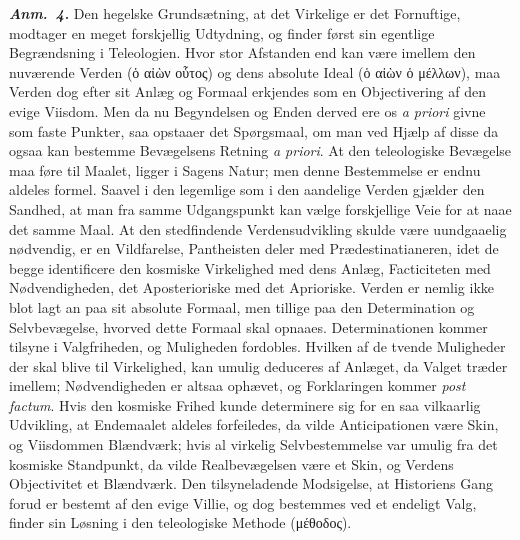 \documentclass[12pt]{book}
\newcommand{\anm}[1]{\emph{\textbf{Anm.~#1.}}}
\newcommand{\opage}[1]{\marginnote{\footnotesize\textit{[#1]}}}
\begin{document}
\anm{4} Den hegelske Grundsætning, at det Virkelige er det
Fornuftige, modtager en meget forskjellig Udtydning, og finder først
sin egentlige Begrændsning i Teleologien. Hvor stor Afstanden end
kan være imellem den nuværende Verden (ὁ αἰὼν οὗτος) og dens
absolute Ideal (ὁ αἰὼν ὁ μέλλων), maa Verden dog efter sit Anlæg og
Formaal erkjendes som en Objectivering af den evige Viisdom. Men da
nu Begyndelsen og Enden derved ere os \textit{a priori} givne som
faste Punkter, saa opstaaer det Spørgsmaal, om man ved Hjælp af
disse da ogsaa kan bestemme Bevægelsens Retning \textit{a priori}.
At den teleologiske Bevægelse maa føre til Maalet, ligger i Sagens
Natur; men denne Bestemmelse er endnu aldeles formel. Saavel i den
legemlige som i den aandelige Verden gjælder den Sandhed, at man
fra samme Udgangspunkt kan vælge forskjellige Veie for at naae det
samme Maal. At den stedfindende Verdensudvikling skulde være
uundgaaelig nødvendig, er en Vildfarelse, Pantheisten deler med
Prædestinatianeren, idet de begge identificere den kosmiske
Virkelighed med dens Anlæg, Facticiteten med Nødvendigheden, det
Aposterioriske med det Aprioriske. Verden er nemlig ikke blot lagt
an paa sit absolute Formaal, men tillige
\opage{240} paa den Determination og Selvbevægelse, hvorved dette Formaal skal
opnaaes. Determinationen kommer tilsyne i Valgfriheden, og
Muligheden fordobles. Hvilken af de tvende Muligheder der skal
blive til Virkelighed, kan umulig deduceres af Anlæget, da Valget
træder imellem; Nødvendigheden er altsaa ophævet, og Forklaringen
kommer \textit{post factum}. Hvis den kosmiske Frihed kunde
determinere sig for en saa vilkaarlig Udvikling, at Endemaalet
aldeles forfeiledes, da vilde Anticipationen være Skin, og
Viisdommen Blændværk; hvis al virkelig Selvbestemmelse var umulig
fra det kosmiske Standpunkt, da vilde Realbevægelsen være et Skin,
og Verdens Objectivitet et Blændværk. Den tilsyneladende
Modsigelse, at Historiens Gang forud er bestemt af den evige
Villie, og dog bestemmes ved et endeligt Valg, finder sin Løsning i
den teleologiske Methode (μέθοδος).
\end{document}
